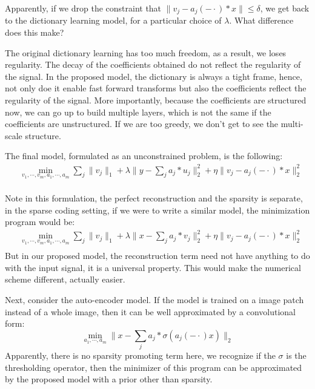 \documentclass[a4paper]{article}
\begin{document}
{Apparently, if we drop the constraint that $\|v_j - a_j(-\cdot)*x\|\leq \delta$, we get back to the dictionary learning model, for a particular choice of $\lambda$. What difference does this make?

The original dictionary learning has too much freedom, as a result, we loses regularity. The decay of the coefficients obtained do not reflect the regularity of the signal. In the proposed model, the dictionary is always a tight frame, hence, not only doe it enable fast forward transforms but also the coefficients reflect the regularity of the signal. More importantly, because the coefficients are structured now, we can go up to build multiple layers, which is not the same if the coefficients are unstructured. If we are too greedy, we don't get to see the multi-scale structure.

The final model, formulated as an unconstrained problem, is the following:
\begin{equation}
	\begin{aligned}
		&\min_{v_1,\cdots,v_m,a_1,\cdots,a_m} \sum_j \|v_j\|_1 + \lambda \|y-\sum_j a_j*u_j\|_2^2 + \eta \|v_j - a_j(-\cdot)*x\|^2_2\\
	\end{aligned}
\end{equation}

Note in this formulation, the perfect reconstruction and the sparsity is separate, in the sparse coding setting, if we were to write a similar model, the minimization program would be:
\begin{equation}
	\begin{aligned}
		&\min_{v_1,\cdots,v_m,a_1,\cdots,a_m} \sum_j \|v_j\|_1 + \lambda \|x-\sum_j a_j*v_j\|_2^2 + \eta \|v_j - a_j(-\cdot)*x\|^2_2\\
	\end{aligned}
\end{equation}
But in our proposed model, the reconstruction term need not have anything to do with the input signal, it is a universal property. This would make the numerical scheme different, actually easier.

Next, consider the auto-encoder model. If the model is trained on a image patch instead of a whole image, then it can be well approximated by a convolutional form:
\begin{equation}
		\min_{a_1,\cdots,a_m}  \|x-\sum_j a_j*\sigma(a_j(-\cdot)x)\|_2
\end{equation}
Apparently, there is no sparsity promoting term here, we recognize if the $\sigma$ is the thresholding operator, then the minimizer of this program can be approximated by the proposed model with a prior other than sparsity.

}
\end{document}
